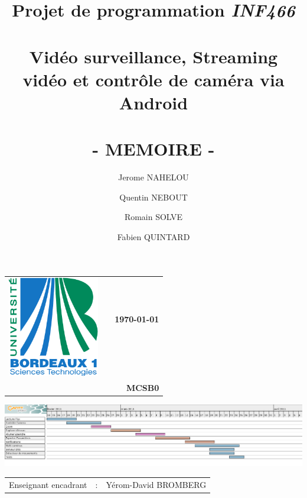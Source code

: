 \documentclass[a4paper,10pt]{report}
\title{\bf Projet de programmation \Large\textit{INF466} \\~\\ \Huge
 Vidéo surveillance, Streaming vidéo et contrôle de caméra via
Android \\~\\
  \Large - MEMOIRE -}
\author{Jerome NAHELOU \and Quentin NEBOUT \and Romain SOLVE \and Fabien
  QUINTARD}
\date{}
\begin{document}
\begin{titlepage}
  \begin{tabularx}{\linewidth}{lXr}
    \multirow{2}{*}{\includegraphics[width=4cm]{logo-bdx1.pdf}} & &
    \bf\Large\today\\ & & \\
    & & \bf MCSB0\\
  \end{tabularx}
  \vfill
  \begin{minipage}[t]{\linewidth}
    \maketitle
    \center\includegraphics{camera.png}
  \end{minipage}
    \vfill
  \begin{tabular}{ r c l }
    Enseignant encadrant & : & Yérom-David BROMBERG\\
  \end{tabular}

  \setcounter{page}{0}
  \thispagestyle{empty}

\end{titlepage}






\tableofcontents \clearpage
\clearpage
\clearpage
\clearpage
\clearpage
\clearpage
\clearpage
\clearpage
\end{document}

